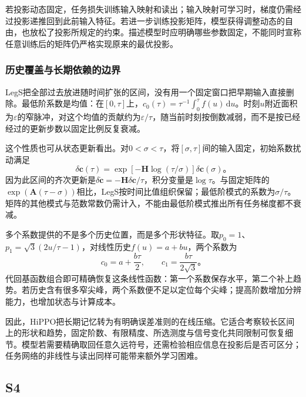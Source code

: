 若投影动态固定，任务损失训练输入映射和读出；输入映射可学习时，梯度仍需经过投影递推回到此前输入特征。若进一步训练投影矩阵，模型获得调整动态的自由，也放松了投影所规定的约束。描述模型时应明确哪些参数固定，不能同时宣称任意训练后的矩阵仍严格实现原来的最优投影。

\subsubsection{历史覆盖与长期依赖的边界}
\label{sec:rnn-hippo-long-memory}

LegS把全部过去放进随时间扩张的区间，没有用一个固定窗口把早期输入直接删除。最低阶系数是均值：在$[0,\tau]$上，$c_0(\tau)=\tau^{-1}\int_0^\tau f(u)\,\mathrm du$。时刻$u$附近面积为$\varepsilon$的窄脉冲，对这个均值的贡献约为$\varepsilon/\tau$，随当前时刻按倒数减弱，而不是按已经经过的更新步数以固定比例反复衰减。

这个性质也可从状态更新看出。对$0<\sigma<\tau$，将$[\sigma,\tau]$间的输入固定，初始系数扰动满足
\begin{equation}
  \delta\bm c(\tau)
    =\exp\!\left[-\bm H\log(\tau/\sigma)\right]\delta\bm c(\sigma)\text{。}
  \label{eq:rnn-hippo-time-ratio}
\end{equation}
因为此区间的齐次更新是$\delta\dot{\bm c}=-\bm H\delta\bm c/\tau$，积分变量是$\log\tau$。与固定矩阵的$\exp(\bm A(\tau-\sigma))$相比，LegS按时间比值组织保留；最低阶模式的系数为$\sigma/\tau$。矩阵的其他模式与范数常数仍需计入，不能由最低阶模式推出所有任务梯度都不衰减。

多个系数提供的不是多个历史位置，而是多个形状特征。取$p_0=1$、$p_1=\sqrt3(2u/\tau-1)$，对线性历史$f(u)=a+bu$，两个系数为
\begin{equation}
  c_0=a+\frac{b\tau}{2},\qquad c_1=\frac{b\tau}{2\sqrt3}\text{。}
  \label{eq:rnn-hippo-linear-example}
\end{equation}
代回基函数组合即可精确恢复这条线性函数：第一个系数保存水平，第二个补上趋势。若历史含有很多窄尖峰，两个系数便不足以定位每个尖峰；提高阶数增加分辨能力，也增加状态与计算成本。

因此，HiPPO把长期记忆转为有明确误差准则的在线压缩。它适合考察较长区间上的形状和趋势，固定阶数、有限精度、所选测度与信号变化共同限制可恢复细节。模型若需要精确取回任意久远符号，还需检验相应信息在投影后是否可区分；任务网络的非线性与读出同样可能带来额外学习困难。

\subsection{S4}
\label{sec:rnn-s4}

